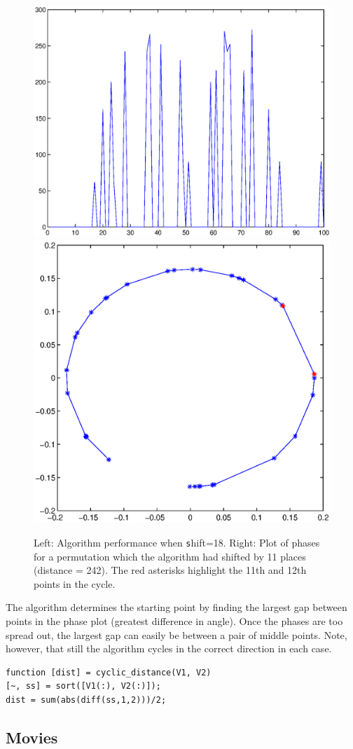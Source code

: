 \documentclass[11pt]{article}
\begin{document}
\begin{figure}[H]
\includegraphics[width=.45\textwidth]{pictures/1_24_16/sine_cpsn_shift18.eps}
\includegraphics[width=.45\textwidth]{pictures/1_24_16/phases_shift18.eps}
\caption{Left: Algorithm performance when \texttt shift=18. Right: Plot of phases for a permutation which the algorithm had shifted by 11 places (distance = 242). The red asterisks highlight the 11th and 12th points in the cycle.}  
\end{figure}
The algorithm determines the starting point by finding the largest gap between points in the phase plot (greatest difference in angle). Once the phases are too spread out, the largest gap can easily be between a pair of middle points. Note, however, that still the algorithm cycles in the correct direction in each case. 


\lstset{language=Matlab, caption=cyclic\_distance}
\begin{lstlisting}[frame=single]
function [dist] = cyclic_distance(V1, V2)
[~, ss] = sort([V1(:), V2(:)]);
dist = sum(abs(diff(ss,1,2)))/2;
\end{lstlisting}

\subsection{Movies}
\end{document}
